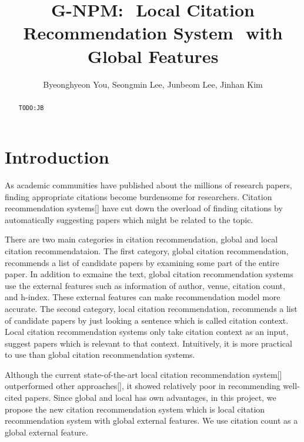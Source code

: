 \documentclass{llncs}
\newcommand{\todo}[1]{\texttt{\color{red}TODO:#1}}
\begin{document}
\title{G-NPM:  Local Citation Recommendation System  with Global Features}

\author{Byeonghyeon You, Seongmin Lee, Junbeom Lee, Jinhan Kim}


\maketitle

\begin{abstract}
\todo{JB}

\end{abstract}

\section{Introduction}
\label{sec:introduction}
As academic communities have published about the millions of research papers, finding appropriate citations become burdensome for researchers. Citation recommendation systems[] have cut down the overload of finding citations by automatically suggesting papers which might be related to the topic.


There are two main categories in citation recommendation, global and local citation recommendataion.
The first category, global citation recommendation, recommends a list of candidate papers by examining some part of the entire paper. In addition to exmaine the text, global citation recommendation systems use the external features such as information of author, venue, citation count, and h-index. These external features can make recommendation model more accurate.
The second category, local citation recommendation, recommends a list of candidate papers by just looking a sentence which is called citation context. Local citation recommendation systems only take citation context as an input, suggest papers which is relevant to that context. Intuitively, it is more practical to use than global citation recommendation systems.


Although the current state-of-the-art local citation recommendation system[] outperformed other approaches[], it showed relatively poor in recommending well-cited papers. Since global and local has own advantages, in this project, we propose the new citation recommendation system which is local citation recommendation system with global external features. We use citation count as a global external feature.
\end{document}
